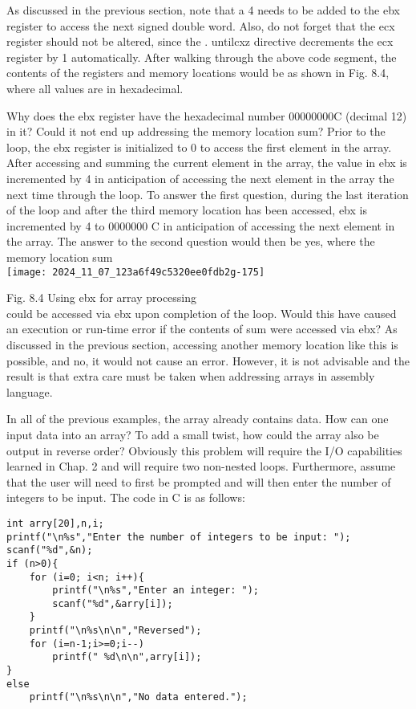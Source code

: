 \documentclass[10pt]{article}
\begin{document}
As discussed in the previous section, note that a 4 needs to be added to the ebx register to access the next signed double word. Also, do not forget that the ecx register should not be altered, since the . untilcxz directive decrements the ecx register by 1 automatically. After walking through the above code segment, the contents of the registers and memory locations would be as shown in Fig. 8.4, where all values are in hexadecimal.

Why does the ebx register have the hexadecimal number 00000000C (decimal 12) in it? Could it not end up addressing the memory location sum? Prior to the loop, the ebx register is initialized to 0 to access the first element in the array. After accessing and summing the current element in the array, the value in ebx is incremented by 4 in anticipation of accessing the next element in the array the next time through the loop. To answer the first question, during the last iteration of the loop and after the third memory location has been accessed, ebx is incremented by 4 to 0000000 C in anticipation of accessing the next element in the array. The answer to the second question would then be yes, where the memory location sum\\
\texttt{[image: 2024\_11\_07\_123a6f49c5320ee0fdb2g-175]}

Fig. 8.4 Using ebx for array processing\\
could be accessed via ebx upon completion of the loop. Would this have caused an execution or run-time error if the contents of sum were accessed via ebx? As discussed in the previous section, accessing another memory location like this is possible, and no, it would not cause an error. However, it is not advisable and the result is that extra care must be taken when addressing arrays in assembly language.

In all of the previous examples, the array already contains data. How can one input data into an array? To add a small twist, how could the array also be output in reverse order? Obviously this problem will require the I/O capabilities learned in Chap. 2 and will require two non-nested loops. Furthermore, assume that the user will need to first be prompted and will then enter the number of integers to be input. The code in C is as follows:

\begin{verbatim}
int arry[20],n,i;
printf("\n%s","Enter the number of integers to be input: ");
scanf("%d",&n);
if (n>0){
    for (i=0; i<n; i++){
        printf("\n%s","Enter an integer: ");
        scanf("%d",&arry[i]);
    }
    printf("\n%s\n\n","Reversed");
    for (i=n-1;i>=0;i--)
        printf(" %d\n\n",arry[i]);
}
else
    printf("\n%s\n\n","No data entered.");
\end{verbatim}
\end{document}
